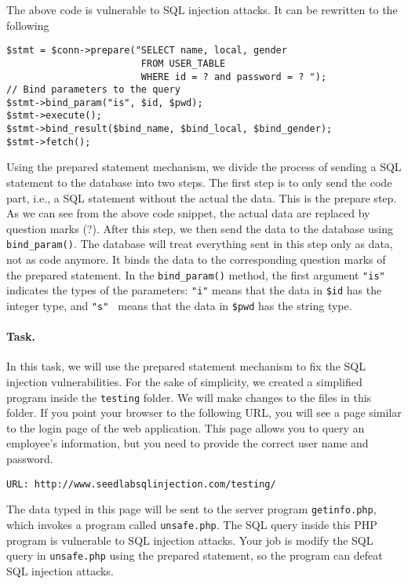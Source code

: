 The above code is vulnerable to SQL injection attacks. 
It can be rewritten to the following


\begin{lstlisting}
$stmt = $conn->prepare("SELECT name, local, gender
                        FROM USER_TABLE 
                        WHERE id = ? and password = ? ");
// Bind parameters to the query
$stmt->bind_param("is", $id, $pwd);
$stmt->execute();
$stmt->bind_result($bind_name, $bind_local, $bind_gender);
$stmt->fetch();
\end{lstlisting}


Using the prepared statement mechanism, we divide the process of sending
a SQL statement to the database into two steps.  
The first step is to only send the code part, i.e., a SQL statement without 
the actual the data. This is the prepare step. As we can see from the 
above code snippet, the actual data are replaced by question
marks (?).  After this step, we then send the data to the database using 
{\tt bind\_param()}.
The database will treat everything sent in this step only as 
data, not as code anymore. It binds the data to the corresponding
question marks of the prepared statement. 
In the {\tt bind\_param()} method, the first argument {\tt "is"} indicates
the types of the parameters: \texttt{"i"} means  
that the data in {\tt \$id} has the integer type,
and \texttt{"s" } means that the data in {\tt \$pwd} has the string type.


\paragraph{Task.} In this task, we will use the prepared statement mechanism to 
fix the SQL injection vulnerabilities. For the sake of simplicity, we 
created a simplified program inside the \texttt{testing} folder. We 
will make changes to the files in this folder. 
If you point your browser to the following URL, you will see a page similar
to the login page of the web application. This page allows you to query an 
employee's information, but you need to provide the correct 
user name and password. 


\begin{lstlisting}
URL: http://www.seedlabsqlinjection.com/testing/
\end{lstlisting}

The data typed in this page will be sent to the 
server program \texttt{getinfo.php}, which 
invokes a program called \texttt{unsafe.php}. 
The SQL query inside this PHP program 
is vulnerable to SQL injection attacks. Your job is modify the SQL 
query in \texttt{unsafe.php} using the prepared statement, so
the program can defeat SQL injection attacks.
 


